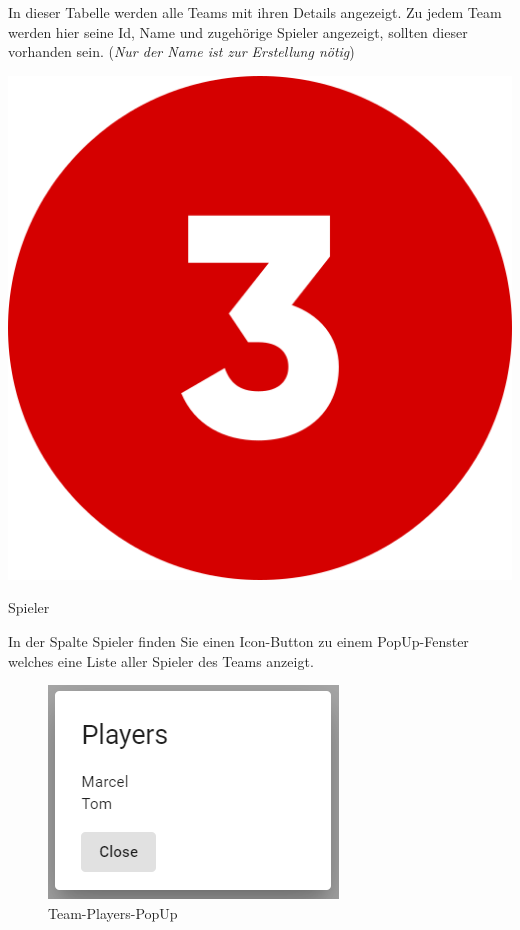 In dieser Tabelle werden alle Teams mit ihren Details angezeigt. Zu jedem Team werden hier seine Id, Name und zugehörige Spieler angezeigt,
sollten dieser vorhanden sein. (\textit{Nur der Name ist zur Erstellung nötig})

\bigskip
\includegraphics[scale=0.05]{pics/user-guide/numbers/number-3.png} \begin{LARGE} Spieler \end{LARGE}

In der Spalte Spieler finden Sie einen Icon-Button zu einem PopUp-Fenster welches eine Liste aller Spieler des Teams anzeigt.

\begin{figure}[H]
    \includegraphics[scale=0.5]{pics/user-guide/teams-player-popup.PNG}
    \caption{Team-Players-PopUp}
\end{figure}

